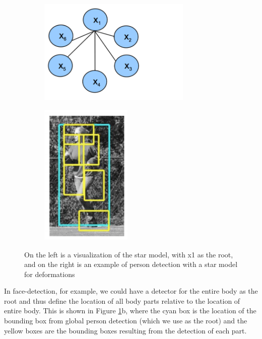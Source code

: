 \documentclass{article}
\begin{document}
\begin{figure}[h]
	\centering
	\begin{subfigure}{0.48\textwidth}
        \includegraphics[width=0.8\textwidth]{star.png}
        \caption{}
    \end{subfigure}
    \hspace*{\fill} %
    \begin{subfigure}{0.48\textwidth}
        \includegraphics[width=0.48\textwidth]{person_star.png}
        \caption{}
    \end{subfigure}
    \caption{On the left is a visualization of the star model, with x1 as the root,
    and on the right is an example of person detection with a star model for 
    deformations}
    \label{fig:star_model}
\end{figure}

In face-detection, for example, we could have a detector for
the entire body as the root and thus define the location of all body parts relative
to the location of entire body. This is shown in Figure \ref{fig:star_model}b,
where the cyan box is the location of the bounding box from global person detection (which we use as the 
root) and the yellow boxes are the bounding boxes resulting from the detection of each part.\\
\end{document}
